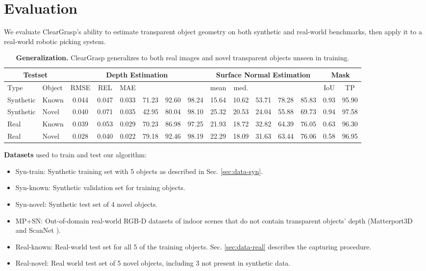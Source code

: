 \documentclass[letterpaper, 10 pt, conference]{ieeeconf}
\begin{document}
\section{Evaluation}
We evaluate ClearGrasp's ability to estimate transparent object geometry on both synthetic and real-world benchmarks, then apply it to a real-world robotic picking system.  

\begin{table*}[t]
    \centering
    \caption{\textbf{Generalization.} ClearGrasp generalizes to both real images and novel transparent objects unseen in training.  \label{table:results_depth}} \vspace{-2mm}
    \setlength\tabcolsep{5.0pt}
     
    \begin{tabular}{ll|cccccc|ccccc|cc}
        \toprule
        \multicolumn{2}{c}{Testset} & \multicolumn{6}{|c|}{Depth Estimation} & \multicolumn{5}{c}{Surface Normal Estimation} & \multicolumn{2}{|c}{Mask}  \\
        \midrule
          Type & Object & RMSE & REL & MAE &  &  &  & mean & med. &  &  &  & IoU & TP \\
        \midrule
        Synthetic & Known & 0.044 & 0.047 & 0.033 & 71.23 & 92.60 & 98.24 & 15.64 & 10.62 & 53.71 & 78.28 & 85.83 & 0.93 & 95.90 \\
        Synthetic & Novel & 0.040 & 0.071 & 0.035 & 42.95 & 80.04 & 98.10 & 25.32 & 20.53 & 24.04 & 55.88 & 69.73 & 0.94 & 97.58 \\
        \midrule
        Real    & Known & 0.039 & 0.053 & 0.029 & 70.23 & 86.98 & 97.25 & 21.93 & 18.72 & 32.82 & 64.39 & 76.05 & 0.63 & 96.30 \\
        Real    & Novel & 0.028 & 0.040 & 0.022 & 79.18 & 92.46 & 98.19 & 22.29 & 18.09 & 31.63 & 63.44 & 76.06 & 0.58 & 96.95 \\
        \bottomrule 
    \end{tabular}
   \vspace{-2mm}
   
\end{table*}

\textbf{Datasets} used to train and test our algorithm: 
\begin{itemize}
    \item Syn-train: Synthetic training set with 5 objects as described in Sec. \ref{sec:data-syn}.
    \item Syn-known: Synthetic validation set for training objects.
    \item Syn-novel: Synthetic test set of 4 novel objects.
    
    \item MP+SN: Out-of-domain real-world RGB-D datasets of indoor scenes that do not contain transparent objects' depth (Matterport3D \cite{Matterport3D} and ScanNet \cite{dai2017scannet}).
    \item Real-known: Real-world test set for all 5 of the training objects. Sec. \ref{sec:data-real} describes the capturing procedure.
    \item Real-novel: Real world test set of 5 novel objects, including 3 not present in synthetic data.
\end{itemize}
\end{document}
